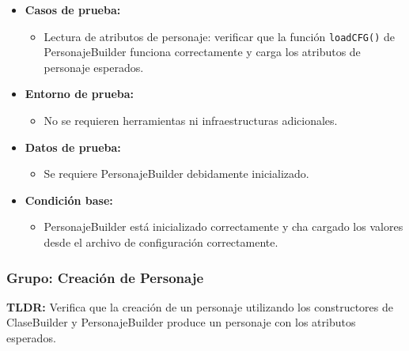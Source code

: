 \documentclass{article}
\begin{document}
\begin{itemize}
	\item \textbf{Casos de prueba:}
	\begin{itemize}
		\item Lectura de atributos de personaje: verificar que la función \texttt{loadCFG()} de PersonajeBuilder funciona correctamente y carga los atributos de personaje esperados.
	\end{itemize}
	
	\item \textbf{Entorno de prueba:}
	\begin{itemize}
		\item No se requieren herramientas ni infraestructuras adicionales.
	\end{itemize}
	
	\item \textbf{Datos de prueba:}
	\begin{itemize}
		\item Se requiere PersonajeBuilder debidamente inicializado.
	\end{itemize}
	
	\item \textbf{Condición base:}
	\begin{itemize}
		\item PersonajeBuilder está inicializado correctamente  y cha cargado los valores desde el archivo de configuración correctamente.
	\end{itemize}
\end{itemize}


\subsubsection{Grupo: Creación de Personaje}
\textbf{TLDR:} Verifica que la creación de un personaje utilizando los constructores de ClaseBuilder y PersonajeBuilder produce un personaje con los atributos esperados.
\end{document}
